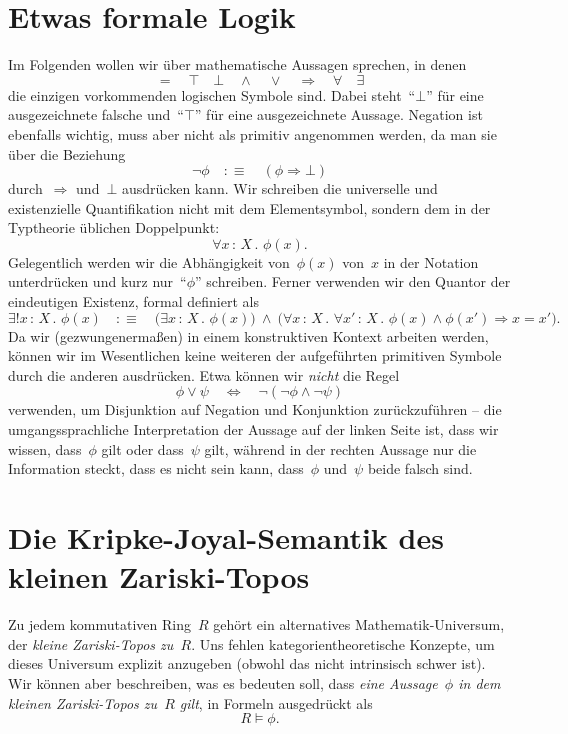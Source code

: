 \documentclass[a4paper,ngerman,12pt]{scrartcl}
\theoremstyle{definition}
\theoremstyle{plain}
\theoremstyle{remark}
\renewcommand{\_}{\mathpunct{.}\,}
\newcommand{\?}{\,{:}\,}
\begin{document}
\tableofcontents


\section{Etwas formale Logik}

Im Folgenden wollen wir über mathematische Aussagen sprechen, in denen
\[ {=} \quad {\top} \quad {\bot} \quad {\wedge} \quad {\vee} \quad {\Rightarrow} \quad {\forall} \quad {\exists} \]
die einzigen vorkommenden logischen Symbole sind. Dabei steht~"`$\bot$"' für
eine ausgezeichnete falsche und~"`$\top$"' für eine ausgezeichnete Aussage.
Negation ist ebenfalls wichtig, muss aber nicht als primitiv
angenommen werden, da man sie über die Beziehung
\[ \neg\phi \quad:\equiv\quad (\phi \Rightarrow \bot) \]
durch~$\Rightarrow$ und~$\bot$ ausdrücken kann.
Wir schreiben die universelle und existenzielle Quantifikation nicht mit dem
Elementsymbol, sondern dem in der Typtheorie üblichen Doppelpunkt:
\[ \forall x\?X\_ \phi(x). \]
Gelegentlich werden wir die Abhängigkeit von~$\phi(x)$ von~$x$ in der Notation
unterdrücken und kurz nur~"`$\phi$"' schreiben. Ferner verwenden wir den
Quantor der eindeutigen Existenz, formal definiert als
\[ \exists! x\?X\_ \phi(x) \quad:\equiv\quad
  \bigl(\exists x\?X\_ \phi(x)\bigr) \ \wedge\ \bigl(\forall x\?X\_ \forall x'\?X\_
  \phi(x) \wedge \phi(x') \Rightarrow x = x'\bigr). \]
Da wir (gezwungenermaßen) in einem konstruktiven Kontext arbeiten werden,
können wir im Wesentlichen keine weiteren der aufgeführten primitiven Symbole
durch die anderen ausdrücken. Etwa können wir \emph{nicht} die Regel
\[ \phi \vee \psi \quad\Longleftrightarrow\quad \neg(\neg\phi \wedge \neg\psi) \]
verwenden, um Disjunktion auf Negation und Konjunktion zurückzuführen -- die
umgangssprachliche Interpretation der Aussage auf der linken Seite ist, dass
wir wissen, dass~$\phi$ gilt oder dass~$\psi$ gilt, während in der rechten
Aussage nur die Information steckt, dass es nicht sein kann, dass~$\phi$
und~$\psi$ beide falsch sind.


\section{Die Kripke-Joyal-Semantik des kleinen Zariski-Topos}

Zu jedem kommutativen Ring~$R$ gehört ein alternatives Mathematik-Universum,
der \emph{kleine Zariski-Topos zu~$R$}. Uns fehlen kategorientheoretische
Konzepte, um dieses Universum explizit anzugeben (obwohl das nicht intrinsisch
schwer ist). Wir können aber beschreiben, was es bedeuten soll, dass \emph{eine
Aussage~$\phi$ in dem kleinen Zariski-Topos zu~$R$ gilt}, in Formeln
ausgedrückt als
\[ R \models \phi. \]
\end{document}
